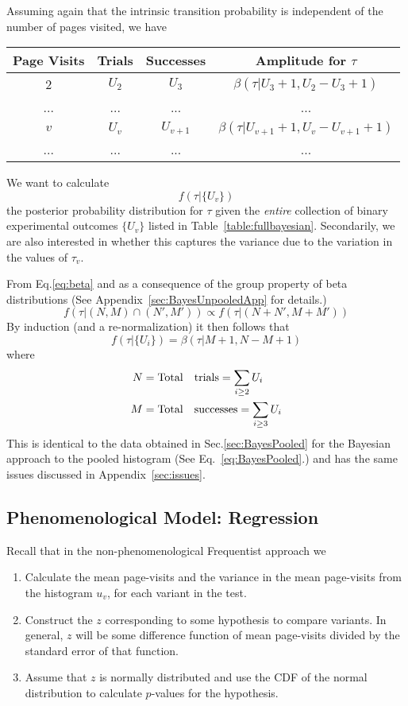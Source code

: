 \documentclass[12pt]{report}
\newcommand{\be}{\begin{enumerate}} %
\newcommand{\ee}{\end{enumerate}} %
\newcommand{\beq}{\begin{equation}} %
\newcommand{\eeq}{\end{equation}} %
\newcommand{\bdm}{\begin{displaymath}} %
\newcommand{\edm}{\end{displaymath}} %
\begin{document}
Assuming again that the intrinsic transition probability is
independent of the number of pages visited, we have
\begin{center}\label{table:fullbayesian}
\begin{tabular}{ |c|c|c|c| } 
 \hline
 Page Visits & Trials & Successes & Amplitude for \(\tau\) \\
 \hline
 2 & \(U_2\) & \(U_3\) & \(\beta(\tau|U_3+1, U_2-U_3+1)\)\\
 ... & ... & ... & ... \\ 
 \(v\) & \(U_v\) & \(U_{v+1}\) & \(\beta(\tau|U_{v+1}+1, U_v-U_{v+1}+1)\)\\
 ... & ... & ... & ... \\
 \hline
\end{tabular}
\end{center}
We want to calculate
\bdm
f(\tau|\{U_v\})
\edm
the posterior probability distribution for \(\tau\) given the {\em
  entire} collection of binary experimental outcomes \(\{U_v\}\)
listed in Table~\ref{table:fullbayesian}.  Secondarily, we are also
interested in whether this captures the variance due to the variation
in the values of \(\tau_v\).

From Eq.\ref{eq:beta} and as a consequence of the group property of
beta distributions (See Appendix~\ref{sec:BayesUnpooledApp} for details.)
\bdm
f(\tau|(N,M)\cap (N',M'))\propto f(\tau|(N+N',M+M'))
\edm
By induction (and a re-normalization) it then follows that
\beq\label{eq:bayes_unpooled}
f(\tau|\{U_i\}) = \beta(\tau|M+1,N-M+1)
\eeq
where
\beq
\begin{split}
  N &= {\rm Total\quad trials} = \sum_{i\ge 2}U_i\\ 
  M &= {\rm Total\quad successes} = \sum_{i\ge 3}U_i
\end{split}
\eeq
This is identical to the data obtained in
Sec.\ref{sec:BayesPooled} for the Bayesian approach to the pooled
histogram (See Eq.~\ref{eq:BayesPooled}.) and has the same issues
discussed in Appendix~\ref{sec:issues}.

\subsection{Phenomenological Model: Regression}
Recall that in the non-phenomenological Frequentist approach we
\be
\item Calculate the mean page-visits and the variance in the mean
  page-visits from the histogram \(u_v\), for each variant in the
  test.
\item Construct the \(z\) corresponding to some hypothesis to compare
  variants. In general, \(z\) will be some difference function of mean
  page-visits divided by the standard error of that function.
\item Assume that \(z\) is normally distributed and use the CDF of the
  normal distribution to calculate \(p\)-values for the hypothesis.
\ee
\end{document}
